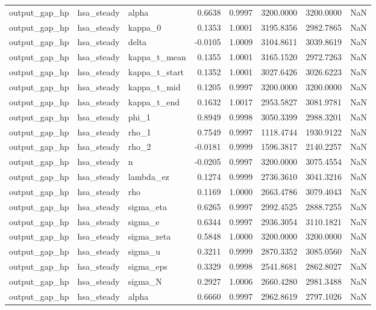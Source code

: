 \begin{tabular}{lllrrrrl}
output\_gap\_hp & hsa\_steady & alpha & 0.6638 & 0.9997 & 3200.0000 & 3200.0000 & NaN \\
output\_gap\_hp & hsa\_steady & kappa\_0 & 0.1353 & 1.0001 & 3195.8356 & 2982.7865 & NaN \\
output\_gap\_hp & hsa\_steady & delta & -0.0105 & 1.0009 & 3104.8611 & 3039.8619 & NaN \\
output\_gap\_hp & hsa\_steady & kappa\_t\_mean & 0.1355 & 1.0001 & 3165.1520 & 2972.7263 & NaN \\
output\_gap\_hp & hsa\_steady & kappa\_t\_start & 0.1352 & 1.0001 & 3027.6426 & 3026.6223 & NaN \\
output\_gap\_hp & hsa\_steady & kappa\_t\_mid & 0.1205 & 0.9997 & 3200.0000 & 3200.0000 & NaN \\
output\_gap\_hp & hsa\_steady & kappa\_t\_end & 0.1632 & 1.0017 & 2953.5827 & 3081.9781 & NaN \\
output\_gap\_hp & hsa\_steady & phi\_1 & 0.8949 & 0.9998 & 3050.3399 & 2988.3201 & NaN \\
output\_gap\_hp & hsa\_steady & rho\_1 & 0.7549 & 0.9997 & 1118.4744 & 1930.9122 & NaN \\
output\_gap\_hp & hsa\_steady & rho\_2 & -0.0181 & 0.9999 & 1596.3817 & 2140.2257 & NaN \\
output\_gap\_hp & hsa\_steady & n & -0.0205 & 0.9997 & 3200.0000 & 3075.4554 & NaN \\
output\_gap\_hp & hsa\_steady & lambda\_ez & 0.1274 & 0.9999 & 2736.3610 & 3041.3216 & NaN \\
output\_gap\_hp & hsa\_steady & rho & 0.1169 & 1.0000 & 2663.4786 & 3079.4043 & NaN \\
output\_gap\_hp & hsa\_steady & sigma\_eta & 0.6265 & 0.9997 & 2992.4525 & 2888.7255 & NaN \\
output\_gap\_hp & hsa\_steady & sigma\_e & 0.6344 & 0.9997 & 2936.3054 & 3110.1821 & NaN \\
output\_gap\_hp & hsa\_steady & sigma\_zeta & 0.5848 & 1.0000 & 3200.0000 & 3200.0000 & NaN \\
output\_gap\_hp & hsa\_steady & sigma\_u & 0.3211 & 0.9999 & 2870.3352 & 3085.0560 & NaN \\
output\_gap\_hp & hsa\_steady & sigma\_eps & 0.3329 & 0.9998 & 2541.8681 & 2862.8027 & NaN \\
output\_gap\_hp & hsa\_steady & sigma\_N & 0.2927 & 1.0006 & 2660.4280 & 2981.3488 & NaN \\
output\_gap\_hp & hsa\_steady & alpha & 0.6660 & 0.9997 & 2962.8619 & 2797.1026 & NaN \\

\end{tabular}
